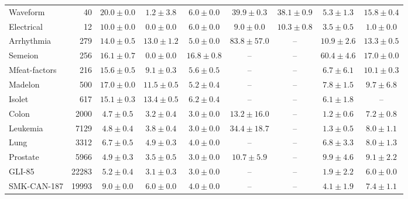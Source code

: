 \begin{minipage}{\linewidth}
{\begin{tabular}{@{}lr*{7}{c}@{}}
Waveform & 40 & $20.0 \pm 0.0$ & $1.2 \pm 3.8$ & $6.0 \pm 0.0$ & $39.9 \pm 0.3$ & $38.1 \pm 0.9$ & $5.3 \pm 1.3$ & $15.8 \pm 0.4$ \\
Electrical & 12 & $10.0 \pm 0.0$ & $0.0 \pm 0.0$ & $6.0 \pm 0.0$ & $9.0 \pm 0.0$ & $10.3 \pm 0.8$ & $3.5 \pm 0.5$ & $1.0 \pm 0.0$ \\
\midrule
Arrhythmia & 279 & $14.0 \pm 0.5$ & $13.0 \pm 1.2$ & $5.0 \pm 0.0$ & $83.8 \pm 57.0$ & -- & $10.9 \pm 2.6$ & $13.3 \pm 0.5$ \\
Semeion & 256 & $16.1 \pm 0.7$ & $0.0 \pm 0.0$ & $16.8 \pm 0.8$ & -- & -- & $60.4 \pm 4.6$ & $17.0 \pm 0.0$ \\
Mfeat-factors & 216 & $15.6 \pm 0.5$ & $9.1 \pm 0.3$ & $5.6 \pm 0.5$ & -- & -- & $6.7 \pm 6.1$ & $10.1 \pm 0.3$ \\
Madelon & 500 & $17.0 \pm 0.0$ & $11.5 \pm 0.5$ & $5.2 \pm 0.4$ & -- & -- & $7.8 \pm 1.5$ & $9.7 \pm 6.8$ \\
Isolet & 617 & $15.1 \pm 0.3$ & $13.4 \pm 0.5$ & $6.2 \pm 0.4$ & -- & -- & $6.1 \pm 1.8$ & -- \\
\midrule
Colon & 2000 & $4.7 \pm 0.5$ & $3.2 \pm 0.4$ & $3.0 \pm 0.0$ & $13.2 \pm 16.0$ & -- & $1.2 \pm 0.6$ & $7.2 \pm 0.8$ \\
Leukemia & 7129 & $4.8 \pm 0.4$ & $3.8 \pm 0.4$ & $3.0 \pm 0.0$ & $34.4 \pm 18.7$ & -- & $1.3 \pm 0.5$ & $8.0 \pm 1.1$ \\
Lung & 3312 & $6.7 \pm 0.5$ & $4.9 \pm 0.3$ & $4.0 \pm 0.0$ & -- & -- & $6.8 \pm 3.3$ & $8.0 \pm 1.3$ \\
Prostate & 5966 & $4.9 \pm 0.3$ & $3.5 \pm 0.5$ & $3.0 \pm 0.0$ & $10.7 \pm 5.9$ & -- & $9.9 \pm 4.6$ & $9.1 \pm 2.2$ \\
GLI-85 & 22283 & $5.2 \pm 0.4$ & $3.1 \pm 0.3$ & $3.0 \pm 0.0$ & -- & -- & $1.9 \pm 2.2$ & $6.0 \pm 0.0$ \\
SMK-CAN-187 & 19993 & $9.0 \pm 0.0$ & $6.0 \pm 0.0$ & $4.0 \pm 0.0$ & -- & -- & $4.1 \pm 1.9$ & $7.4 \pm 1.1$ \\
\bottomrule
\end{tabular}%
}
\end{minipage}\par
